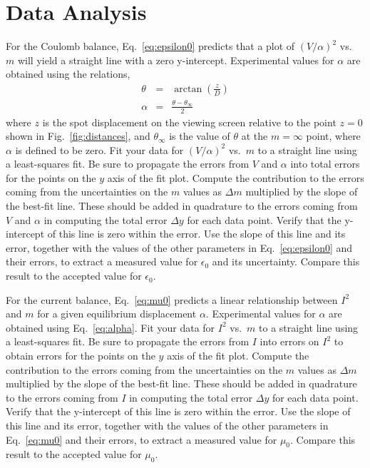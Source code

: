\documentclass{revtex4}
\begin{document}
\section{Data Analysis}

For the Coulomb balance, Eq.~\ref{eq:epsilon0} predicts that a plot of
$(V/\alpha)^2$ vs.\ $m$ will yield a straight line with a zero y-intercept.
Experimental values for $\alpha$ are obtained using the relations,
\begin{eqnarray}
\theta &=& \arctan\left(\frac{z}{D}\right) \nonumber \\
\alpha &=& \frac{\theta-\theta_{\infty}}{2}
\label{eq:alpha}
\end{eqnarray}
where $z$ is the spot displacement on the viewing screen relative to the
point $z=0$ shown in Fig.~\ref{fig:distances}, and $\theta_{\infty}$ is
the value of $\theta$ at the $m=\infty$ point, where $\alpha$ is defined
to be zero.  Fit your data for $(V/\alpha)^2$ vs.\ $m$
to a straight line using a least-squares fit.  Be sure to propagate the
errors from $V$ and $\alpha$ into total errors for the points on the $y$
axis of the fit plot.  Compute the contribution to the errors 
coming from the uncertainties on the $m$ values as $\Delta m$ 
multiplied by the slope of the best-fit line.  These should be added in
quadrature to the errors coming from $V$ and $\alpha$ in computing the
total error $\Delta y$ for each data point.  Verify that the y-intercept
of this line is zero within the error.  Use the slope of this line and
its error, together with the values of the other parameters in
Eq.~\ref{eq:epsilon0} and their errors, to extract a measured value for
$\epsilon_0$ and its uncertainty.  Compare this result to the accepted
value for $\epsilon_0$.

For the current balance, Eq.~\ref{eq:mu0} predicts a linear relationship
between $I^2$ and $m$ for a given equilibrium displacement $\alpha$.
Experimental values for $\alpha$ are obtained using Eq.~\ref{eq:alpha}.
Fit your data for $I^2$ vs.\ $m$ to a straight line using a least-squares
fit.  Be sure to propagate the errors from $I$ into errors on $I^2$ to
obtain errors for the points on the $y$ axis of the fit plot.  Compute
the contribution to the errors coming from the uncertainties on the $m$
values as $\Delta m$ multiplied by the slope of the best-fit line.
These should be added in quadrature to the errors coming from $I$ in
computing the total error $\Delta y$ for each data point.  Verify that
the y-intercept of this line is zero within the error.  Use the slope of
this line and its error, together with the values of the other parameters in
Eq.~\ref{eq:mu0} and their errors, to extract a measured value for
$\mu_0$.  Compare this result to the accepted value for $\mu_0$.
\end{document}
